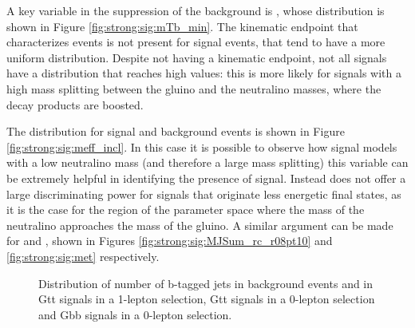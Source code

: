 A key variable in the suppression of the \ttbar background is \mtb, whose distribution is shown in Figure \ref{fig:strong:sig:mTb_min}.
The kinematic endpoint that characterizes \ttbar events is not present for signal events, that tend to have a more uniform distribution.
Despite not having a kinematic endpoint, not all signals have a \mtb distribution that reaches high values: this is more likely for 
signals with a high mass splitting between the gluino and the neutralino masses, where the decay products are boosted.

The \meff distribution for signal and background events is shown in Figure \ref{fig:strong:sig:meff_incl}. 
In this case it is possible to observe how signal models with a low neutralino mass (and therefore a large mass splitting)
this variable can be extremely helpful in identifying the presence of signal. 
Instead \meff does not offer a large discriminating power for signals that originate less energetic final states, as it is the 
case for the region of the parameter space where the mass of the neutralino approaches the mass of the gluino.
A similar argument can be made for \mjsum and \met, shown in Figures \ref{fig:strong:sig:MJSum_rc_r08pt10} and \ref{fig:strong:sig:met} respectively. 


\begin{figure}[htbp]
\centering 
{}
\caption{Distribution of number of b-tagged jets in background events and in  Gtt signals in a 1-lepton selection,
 Gtt signals in a 0-lepton selection and
 Gbb signals in a 0-lepton selection.
}\label{fig:strong:sig:bjets_n}
\end{figure}


